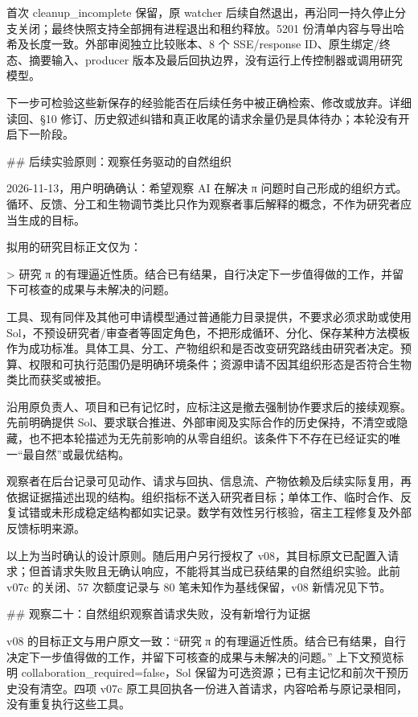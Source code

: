 首次 cleanup_incomplete 保留，原 watcher 后续自然退出，再沿同一持久停止分支关闭；最终快照支持全部拥有进程退出和租约释放。5201 份清单内容与导出哈希及长度一致。外部审阅独立比较账本、8 个 SSE/response ID、原生绑定/终态、摘要输入、producer 版本及最后回执边界，没有运行上传控制器或调用研究模型。

下一步可检验这些新保存的经验能否在后续任务中被正确检索、修改或放弃。详细读回、§10 修订、历史叙述纠错和真正收尾的请求余量仍是具体待办；本轮没有开启下一阶段。

## 后续实验原则：观察任务驱动的自然组织

2026-11-13，用户明确确认：希望观察 AI 在解决 π 问题时自己形成的组织方式。循环、反馈、分工和生物调节类比只作为观察者事后解释的概念，不作为研究者应当生成的目标。

拟用的研究目标正文仅为：

> 研究 π 的有理逼近性质。结合已有结果，自行决定下一步值得做的工作，并留下可核查的成果与未解决的问题。

工具、现有同伴及其他可申请模型通过普通能力目录提供，不要求必须求助或使用 Sol，不预设研究者/审查者等固定角色，不把形成循环、分化、保存某种方法模板作为成功标准。具体工具、分工、产物组织和是否改变研究路线由研究者决定。预算、权限和可执行范围仍是明确环境条件；资源申请不因其组织形态是否符合生物类比而获奖或被拒。

沿用原负责人、项目和已有记忆时，应标注这是撤去强制协作要求后的接续观察。先前明确提供 Sol、要求联合推进、外部审阅及实际合作的历史保持，不清空或隐藏，也不把本轮描述为无先前影响的从零自组织。该条件下不存在已经证实的唯一“最自然”或最优结构。

观察者在后台记录可见动作、请求与回执、信息流、产物依赖及后续实际复用，再依据证据描述出现的结构。组织指标不送入研究者目标；单体工作、临时合作、反复试错或未形成稳定结构都如实记录。数学有效性另行核验，宿主工程修复及外部反馈标明来源。

以上为当时确认的设计原则。随后用户另行授权了 v08，其目标原文已配置入请求；但首请求失败且无确认响应，不能将其当成已获结果的自然组织实验。此前 v07c 的关闭、57 次额度记录与 80 笔未知作为基线保留，v08 新情况见下节。

## 观察二十：自然组织观察首请求失败，没有新增行为证据

v08 的目标正文与用户原文一致：“研究 π 的有理逼近性质。结合已有结果，自行决定下一步值得做的工作，并留下可核查的成果与未解决的问题。” 上下文预览标明 collaboration_required=false，Sol 保留为可选资源；已有主记忆和前次干预历史没有清空。四项 v07c 原工具回执各一份进入首请求，内容哈希与原记录相同，没有重复执行这些工具。

